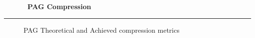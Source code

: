 % 
% 
% 
% 
% 
%
\cleardoublepage
\begin{figure*}[h!]
  \centering
  \hfill
  {\Huge {\bf \quarter\ PAG Compression}}
  \hfill
\end{figure*}
\hrule
\begin{figure*}[h!]
  \centering
  \caption{PAG Theoretical and Achieved compression metrics}
\end{figure*}

